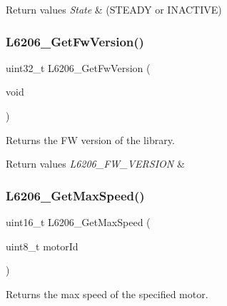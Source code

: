 \begin{DoxyRetVals}{Return values}
{\em State} & (S\+T\+E\+A\+DY or I\+N\+A\+C\+T\+I\+VE) \\
\hline
\end{DoxyRetVals}
\mbox{\label{group___l6206___exported___functions_gad12aece8f24b63edc2e1fb7dc733a5a6}} 
\subsubsection{\texorpdfstring{L6206\+\_\+\+Get\+Fw\+Version()}{L6206\_GetFwVersion()}}
{\footnotesize\ttfamily uint32\+\_\+t L6206\+\_\+\+Get\+Fw\+Version (\begin{DoxyParamCaption}\item[{void}]{ }\end{DoxyParamCaption})}



Returns the FW version of the library. 


\begin{DoxyRetVals}{Return values}
{\em L6206\+\_\+\+F\+W\+\_\+\+V\+E\+R\+S\+I\+ON} & \\
\hline
\end{DoxyRetVals}
\mbox{\label{group___l6206___exported___functions_gae656e681fb3c93267e8589d97d3cad8f}} 
\subsubsection{\texorpdfstring{L6206\+\_\+\+Get\+Max\+Speed()}{L6206\_GetMaxSpeed()}}
{\footnotesize\ttfamily uint16\+\_\+t L6206\+\_\+\+Get\+Max\+Speed (\begin{DoxyParamCaption}\item[{uint8\+\_\+t}]{motor\+Id }\end{DoxyParamCaption})}



Returns the max speed of the specified motor. 


